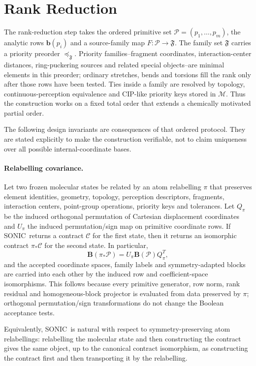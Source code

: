 \documentclass[journal=jctcce,manuscript=article,layout=traditional]{achemso}
\newcommand{\SONIC}{SONIC}
\newcommand{\Bmat}{\mathbf{B}}
\newcommand{\bmat}{\mathbf{b}}
\theoremstyle{definition}
\begin{document}
\section{Rank Reduction}

The rank-reduction step takes the ordered primitive set
\(\mathcal{P}=(p_1,\ldots,p_m)\), the analytic rows
\(\bmat(p_i)\) and a source-family map \(F:\mathcal{P}\to\mathfrak{F}\).
The family set \(\mathfrak{F}\) carries a priority preorder
\(\preceq_{\mathfrak{F}}\).  Priority families--fragment coordinates,
interaction-center distances, ring-puckering sources and related special
objects--are minimal elements in this preorder; ordinary stretches, bends and
torsions fill the rank only after those rows have been tested.  Ties inside
a family are resolved by topology, continuous-perception equivalence and
CIP-like priority keys stored in \(\mathcal{M}\).  Thus the construction works on a
fixed total order that extends a chemically motivated partial order.

The following design invariants are consequences of that ordered protocol.
They are stated explicitly to make the construction verifiable, not to claim
uniqueness over all possible internal-coordinate bases.

\paragraph{Relabelling covariance.}
\label{thm:relabel}
Let two frozen molecular states be related by an atom relabelling \(\pi\) that
preserves element identities, geometry, topology, perception descriptors, fragments,
interaction centers, point-group operations, priority keys and tolerances.  Let
\(Q_\pi\) be the induced orthogonal permutation of Cartesian displacement
coordinates and \(U_\pi\) the induced permutation/sign map on primitive
coordinate rows.  If \SONIC\ returns a contract \(\mathcal{C}\) for the first
state, then it returns an isomorphic contract \(\pi_*\mathcal{C}\) for the
second state.  In particular,
\[
  \Bmat(\pi_*\mathcal{P})
  =
  U_\pi \Bmat(\mathcal{P}) Q_\pi^T,
\]
and the accepted coordinate spaces, family labels and symmetry-adapted blocks
are carried into each other by the induced row and coefficient-space
isomorphisms.
This follows because every primitive generator, row norm, rank residual and
homogeneous-block projector is evaluated from data preserved by \(\pi\);
orthogonal permutation/sign transformations do not change the Boolean
acceptance tests.

Equivalently, \SONIC\ is natural with respect to symmetry-preserving atom
relabellings: relabelling the molecular state and then constructing the
contract gives the same object, up to the canonical contract isomorphism, as
constructing the contract first and then transporting it by the relabelling.
\end{document}
